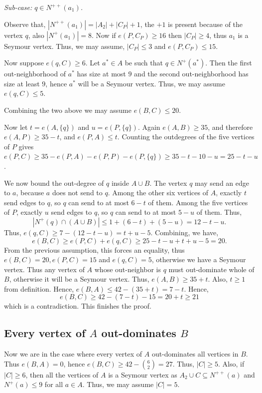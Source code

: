 \documentclass[a4paper,fleqn]{cas-sc}
\theoremstyle{definition}
\begin{document}
\medskip
\emph{Sub-case: $q\in N^{++}(a_1)$.}

Observe that, $|N^{++}(a_1)|=|A_2|+|C_P|+1$, the $+1$ is present because of the vertex $q$, also $|N^+(a_1)|=8$. Now if $e(P,C_P)\geq 16$ then $|C_P|\geq 4$, thus $a_1$ is a Seymour vertex. Thus, we may assume, $|C_P|\leq 3$ and $e(P,C_P)\leq 15$.

Now suppose $e(q,C)\geq 6$. Let $a^*\in A$ be such that $q\in N^+(a^*)$. Then the first out-neighborhood of $a^*$ has size at most $9$ and the second out-neighborhood has size at least $9$, hence $a^*$ will be a Seymour vertex. Thus, we may assume $e(q,C)\leq 5$. 

Combining the two above we may assume $e(B,C)\leq 20$.

Now let $t=e(A,\{q\})$ and $u=e(P,\{q\})$. Again $e(A,B)\ge 35$, and therefore
$e(A,P)\ge 35-t$, and $e(P,A)\le t.$
Counting the outdegrees of the five vertices of $P$ gives $e(P,C)\ge 35-e(P,A)-e(P,P)-e(P,\{q\})\ge 35-t-10-u=25-t-u$.

We now bound the out-degree of $q$ inside $A\cup B$. The vertex $q$ may send an edge to $a$, because $a$ does not send to $q$. Among the other six vertices of $A$, exactly $t$ send edges to $q$, so $q$ can send to at most $6-t$ of them. Among the five vertices of $P$, exactly $u$ send edges to $q$, so $q$ can send to at most $5-u$ of them. Thus,
\[
|N^+(q)\cap (A\cup B)|\le 1+(6-t)+(5-u)=12-t-u.
\]
Thus, $e(q,C)\geq 7-(12-t-u)=t+u-5$. Combining, we have,
 \[
 e(B,C)\geq e(P,C)+e(q,C)\geq 25-t-u+t+u-5=20
 .\]
From the previous assumption, this forces an equality, thus $e(B,C)=20, e(P,C)=15$ and $e(q,C)=5$, otherwise we have a Seymour vertex. 
Thus any vertex of $A$ whose out-neighbor is $q$ must out-dominate whole of $B$, otherwise it will be a Seymour vertex. Thus, $e(A,B)\geq 35+t$. Also, $t\geq 1$ from definition. Hence, $e(B,A)\leq 42-(35+t)=7-t$. Hence,
\[
e(B,C)\ge 42-(7-t)-15=20+t\geq 21
\]
which is a contradiction. This finishes the proof.



\subsection*{Every vertex of $A$ out-dominates $B$}

Now we are in the case where every vertex of $A$ out-dominates all vertices in $B$. Thus $e(B,A)=0$, hence $e(B,C)\geq 42-\binom{6}{2}=27$. Thus, $|C|\geq 5$. Also, if $|C|\geq 6$, then all the vertices of $A$ is a Seymour vertex as $A_2\cup C \subseteq N^{++}(a)$ and $N^+(a)\leq 9$ for all $a\in A$. Thus, we may assume $|C|=5$.
\end{document}
